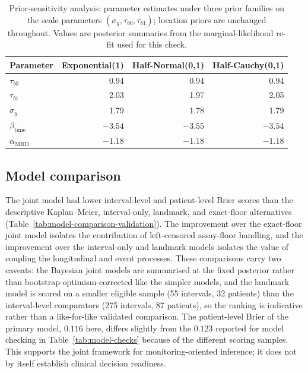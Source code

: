 \documentclass[11pt]{article}
\begin{document}
\begin{table}[!htbp]
\centering
\caption{Prior-sensitivity analysis: parameter estimates under three prior
families on the scale parameters $(\sigma_y,\tau_{b0},\tau_{b1})$; location
priors are unchanged throughout. Values are posterior summaries from the
marginal-likelihood re-fit used for this check.}
\label{tab:prior-sensitivity}
\small
\begin{tabular}{lrrr}
\toprule
Parameter & Exponential(1) & Half-Normal(0,1) & Half-Cauchy(0,1)\\
\midrule
$\tau_{b0}$              & 0.94 & 0.94 & 0.94\\
$\tau_{b1}$              & 2.03 & 1.97 & 2.05\\
$\sigma_y$               & 1.79 & 1.78 & 1.79\\
$\beta_{\mathrm{time}}$  & $-3.54$ & $-3.55$ & $-3.54$\\
$\alpha_{\mathrm{MRD}}$  & $-1.18$ & $-1.18$ & $-1.18$\\
\bottomrule
\end{tabular}
\end{table}

\subsection{Model comparison}

The joint model had lower interval-level and patient-level Brier scores
than the descriptive Kaplan--Meier, interval-only, landmark, and
exact-floor alternatives (Table~\ref{tab:model-comparison-validation}). The improvement
over the exact-floor joint model isolates the contribution of
left-censored assay-floor handling, and the improvement over the
interval-only and landmark models isolates the value of coupling the
longitudinal and event processes. These comparisons carry two caveats: the
Bayesian joint models are summarised at the fixed posterior rather than
bootstrap-optimism-corrected like the simpler models, and the landmark model
is scored on a smaller eligible sample (55 intervals, 32 patients) than the
interval-level comparators (275 intervals, 87 patients), so the ranking is
indicative rather than a like-for-like validated comparison. The
patient-level Brier of the primary model, $0.116$ here, differs slightly from
the $0.123$ reported for model checking in Table~\ref{tab:model-checks}
because of the different scoring samples. This supports the joint framework
for monitoring-oriented inference; it does not by itself establish clinical
decision readiness.
\end{document}
